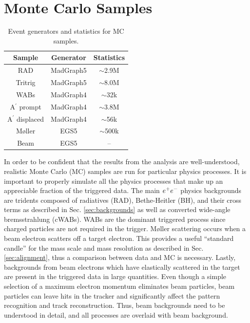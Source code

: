 \clearpage

\section{Monte Carlo Samples}\label{sec:mc}

\begin{table}[!hb] 
\centering
\begin{tabular}{ccc}
   \toprule    
    Sample & Generator & Statistics \\
    \midrule
     RAD      & MadGraph5 & $\sim$2.9M \\
     Tritrig & MadGraph5 & $\sim$8.0M \\
     WABs     & MadGraph4 & $\sim$32k \\
     A$^{'}$ prompt & MadGraph4 & $\sim$3.8M \\
     A$^{'}$ displaced & MadGraph4 & $\sim$56k \\
     M\o ller & EGS5 & $\sim$500k \\
     Beam & EGS5 & -- \\   
     \bottomrule
\end{tabular}
\caption{Event generators and statistics for MC samples.}
\label{table:samples}
\end{table}

In order to be confident that the results from the analysis are well-understood, realistic Monte Carlo (MC) samples are run for particular physics processes. %
It is important to properly simulate all the physics processes that make up an appreciable fraction of the triggered data. The main $e^{+}e^{-}$ physics backgrounds are tridents composed of radiatives (RAD), Bethe-Heitler (BH), and their cross terms as described in Sec. \ref{sec:backgrounds} as well as converted wide-angle bremsstrahlung (cWABs). WABs are the dominant triggered process since charged particles are not required in the trigger. M\o ller scattering occurs when a beam electron scatters off a target electron. This provides a useful ``standard candle'' for the mass scale and mass resolution as described in Sec. \ref{sec:alignment}, thus a comparison between data and MC is necessary. Lastly, backgrounds from beam electrons which have elastically scattered in the target are present in the triggered data in large quantities. Even though a simple selection of a maximum electron momentum eliminates beam particles, beam particles can leave hits in the tracker and significantly affect the pattern recognition and track reconstruction. Thus, beam backgrounds need to be understood in detail, and all processes are overlaid with beam background.

